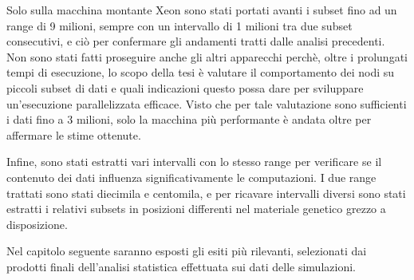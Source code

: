 Solo sulla macchina montante Xeon sono stati portati avanti i subset fino ad un range di 9 milioni, sempre con un intervallo di 1 milioni tra due subset consecutivi, e ciò per confermare gli andamenti tratti dalle analisi precedenti.
Non sono stati fatti proseguire anche gli altri apparecchi perchè, oltre i prolungati tempi di esecuzione, lo scopo della tesi è valutare il comportamento dei nodi su piccoli subset di dati e quali indicazioni questo possa dare per sviluppare un'esecuzione parallelizzata efficace. 
Visto che per tale valutazione sono sufficienti i dati fino a 3 milioni, solo la macchina più performante è andata oltre per affermare le stime ottenute.

Infine, sono stati estratti vari intervalli con lo stesso range per verificare se il contenuto dei dati influenza significativamente le computazioni.
I due range trattati sono stati diecimila e centomila, e per ricavare intervalli diversi sono stati estratti i relativi subsets in posizioni differenti nel materiale genetico grezzo a disposizione.

Nel capitolo seguente saranno esposti gli esiti più rilevanti, selezionati dai prodotti finali dell'analisi statistica effettuata sui dati delle simulazioni.  

